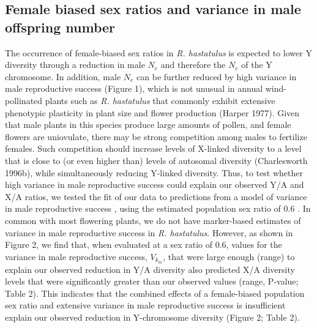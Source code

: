 \documentclass[9pt,twocolumn,twoside]{gsajnl}
\begin{document}

\subsection*{Female biased sex ratios and variance in male offspring number}
The occurrence of female-biased sex ratios in \textit{R. hastatulus} is expected to lower Y diversity through a reduction in male $N_{e}$ and therefore the $N_{e}$ of the Y chromosome. In addition, male $N_{e}$ can be further reduced by high variance in male reproductive success (Figure 1), which is not unusual in annual wind-pollinated plants such as \textit{R. hastatulus} that commonly exhibit extensive phenotypic plasticity in plant size and flower production (\X Harper 1977). Given that male plants in this species produce large amounts of pollen, and female flowers are uniovulate, there may be strong competition among males to fertilize females. Such competition should increase levels of X-linked diversity to a level that is close to (or even higher than) levels of autosomal diversity (Charlesworth 1996b), while simultaneously reducing Y-linked diversity. Thus, to test whether high variance in male reproductive success could explain our observed Y/A and X/A ratios, we tested the fit of our data to predictions from a model of variance in male reproductive success \citep{kimura1964number}, using the estimated population sex ratio of 0.6 \citep{pickup2013influence}. In common with most flowering plants, we do not have marker-based estimates of variance in male reproductive success in \textit{R. hastatulus}. However, as shown in Figure 2, we find that, when evaluated at a sex ratio of 0.6, values for the variance in male reproductive success, $V_{k}_{m}$, that were large enough (range) to explain our observed reduction in Y/A diversity also predicted X/A diversity levels that were significantly greater than our observed values (range, P-value; Table 2). This indicates that the combined effects of a female-biased population sex ratio and extensive variance in male reproductive success is insufficient explain our observed  reduction in Y-chromosome diversity (Figure 2; Table 2).

\end{document}
